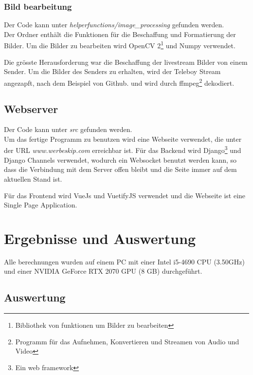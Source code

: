 \documentclass[12pt,a4paper]{report}
\begin{document}
\subsection{Bild bearbeitung}
Der Code kann unter \textit{helperfunctions/image\_processing} gefunden werden.\bigskip\\
Der Ordner enthält die Funktionen für die Beschaffung und Formatierung der Bilder.
Um die Bilder zu bearbeiten wird OpenCV 2\footnote{Bibliothek von funktionen um Bilder zu bearbeiten} und Numpy verwendet.

Die grösste Herausforderung war die Beschaffung der livestream Bilder von einem Sender.
Um die Bilder des Senders zu erhalten, wird der Teleboy Stream angezapft, nach dem Beispiel von Github.\cite{gittele} und
wird durch ffmpeg\footnote{Programm für das Aufnehmen, Konvertieren und Streamen von Audio und Video} dekodiert.

\section{Webserver}
Der Code kann unter \textit{src} gefunden werden.\bigskip\\
Um das fertige Programm zu benutzen wird eine Webseite verwendet, die unter der URL \textit{www.werbeskip.com} erreichbar ist.
Für das Backend wird Django\footnote{Ein web framework} und Django Channels verwendet, wodurch ein Websocket benutzt werden kann,
so dass die Verbindung mit dem Server offen bleibt und die Seite immer auf dem aktuellen Stand ist.

Für das Frontend wird VueJs und VuetifyJS verwendet und die Webseite ist eine Single Page Application.

\chapter{Ergebnisse und Auswertung}\label{ch:ergebnisseUndAuswertung}
Alle berechnungen wurden auf einem PC mit einer Intel i5-4690 CPU (3.50GHz) und einer NVIDIA GeForce RTX 2070 GPU (8 GB) durchgeführt.
\section{Auswertung}
\end{document}

